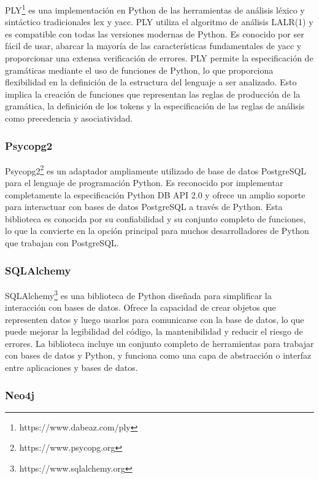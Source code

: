 PLY\footnote{https://www.dabeaz.com/ply} es una implementación en Python de las 
herramientas de análisis léxico y sintáctico 
tradicionales lex y yacc. PLY utiliza el algoritmo de análisis LALR(1) y es 
compatible con todas las versiones modernas de Python. Es conocido por ser fácil de usar,
abarcar la mayoría de las características fundamentales de yacc y proporcionar una extensa verificación de errores. 
PLY permite la especificación de gramáticas 
mediante el uso de funciones de Python, lo que proporciona flexibilidad en la definición de la estructura del 
lenguaje a ser analizado. Esto implica la creación de funciones que representan las reglas de producción de la 
gramática, la definición de los tokens y la especificación de las reglas de 
análisis como precedencia y asociatividad.

\subsubsection{Psycopg2}

Psycopg2\footnote{https://www.psycopg.org} es un adaptador ampliamente utilizado de base de datos PostgreSQL 
para el lenguaje de programación 
Python. Es reconocido por implementar completamente la especificación Python DB API 2.0 y ofrece un amplio 
soporte para interactuar con bases de datos PostgreSQL a través de Python. Esta biblioteca es conocida por 
su confiabilidad y su conjunto completo de funciones, lo que la convierte en la opción principal para muchos 
desarrolladores de Python que trabajan con PostgreSQL.

\subsubsection{SQLAlchemy}

SQLAlchemy\footnote{https://www.sqlalchemy.org} es una biblioteca de Python diseñada para simplificar la 
interacción con bases de datos. Ofrece la 
capacidad de crear objetos que representen datos y luego usarlos para comunicarse con la base de datos, lo que 
puede mejorar la legibilidad del código, la mantenibilidad y reducir el riesgo de errores. La biblioteca incluye 
un conjunto completo de herramientas para trabajar con bases de datos y Python, y funciona como una capa de 
abstracción o interfaz entre aplicaciones y bases de datos. 

\subsubsection{Neo4j}

